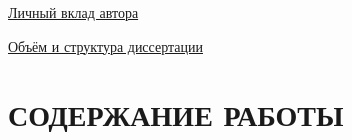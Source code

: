 \underline{Личный вклад автора}

\underline{Объём и структура диссертации}

\section*{СОДЕРЖАНИЕ РАБОТЫ}









%
%
%
